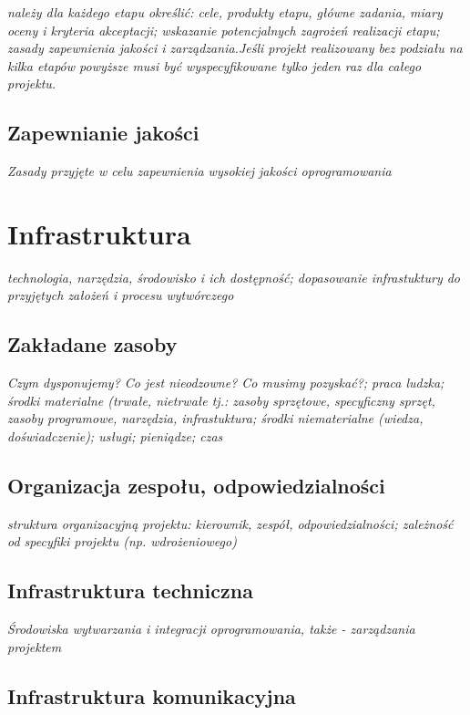 \documentclass[11pt,oneside,a4paper,titlepage,onecolumn]{article}
\begin{document}
\emph{należy dla każdego etapu określić: cele, produkty etapu, główne zadania, miary oceny i kryteria akceptacji; wskazanie potencjalnych zagrożeń realizacji etapu; zasady zapewnienia jakości i zarządzania.Jeśli projekt realizowany bez podziału na kilka etapów powyższe musi być wyspecyfikowane tylko jeden raz dla całego projektu.}

\subsection{Zapewnianie jakości}

\emph{Zasady przyjęte w celu zapewnienia wysokiej jakości oprogramowania}

\section{Infrastruktura}

\emph{technologia, narzędzia, środowisko i ich dostępność; dopasowanie infrastuktury do przyjętych założeń i procesu wytwórczego}

\subsection{Zakładane zasoby}

\emph{Czym dysponujemy? Co jest nieodzowne? Co musimy pozyskać?; praca ludzka; środki materialne (trwałe, nietrwałe tj.: zasoby sprzętowe, specyficzny sprzęt, zasoby programowe, narzędzia, infrastuktura; środki niematerialne (wiedza, doświadczenie); usługi; pieniądze; czas}

\subsection{Organizacja zespołu, odpowiedzialności}

\emph{struktura organizacyjną projektu: kierownik, zespół, odpowiedzialności; zależność od specyfiki projektu (np. wdrożeniowego)}

\subsection{Infrastruktura techniczna}

\emph{Środowiska wytwarzania i integracji oprogramowania, także - zarządzania projektem}

\subsection{Infrastruktura komunikacyjna}
\end{document}

